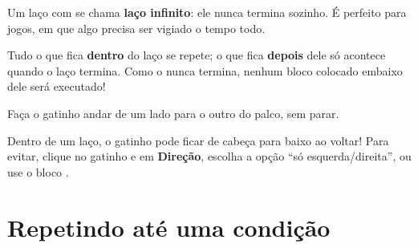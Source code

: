 \begin{codigo}
\begin{pilha}
\sbcend
\end{pilha}
\begin{pilha}
\sbcend
\end{pilha}
\end{codigo}

\begin{vocabulario}
Um laço com  se chama \textbf{laço infinito}: ele nunca termina sozinho. É perfeito para jogos, em que algo precisa ser vigiado o tempo todo.
\end{vocabulario}

\begin{cuidado}
Tudo o que fica \textbf{dentro} do laço se repete; o que fica \textbf{depois} dele só acontece quando o laço termina. Como o  nunca termina, nenhum bloco colocado embaixo dele será executado!
\end{cuidado}

\begin{missao}
Faça o gatinho andar de um lado para o outro do palco, sem parar.
\end{missao}

\begin{codigo}[Patrulha]
\begin{pilha}
\sbcend
\end{pilha}
\end{codigo}

\begin{cuidado}
Dentro de um laço, o gatinho pode ficar de cabeça para baixo ao voltar! Para evitar, clique no gatinho e em \textbf{Direção}, escolha a opção ``só esquerda/direita'', ou use o bloco .
\end{cuidado}

\section{Repetindo até uma condição}

